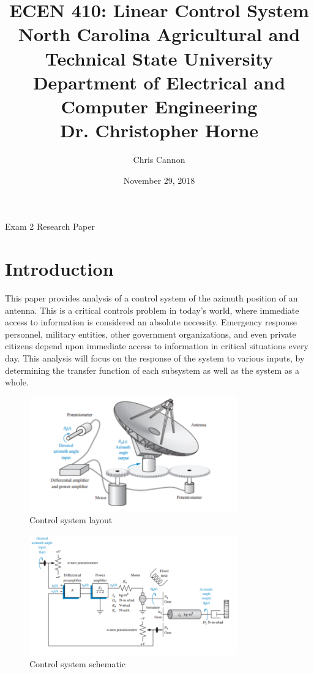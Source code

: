 \documentclass[12pt]{article}
\title {{\titleFont ECEN 410:  Linear Control System \\ North Carolina Agricultural and Technical State University \\ Department of Electrical and Computer Engineering \\ Dr. Christopher Horne}} %
\author{\titleFont  Chris Cannon} %
\date{\titleFont November 29, 2018}
\begin{document}
\begin{titlingpage}
\maketitle
\begin{center}
	Exam 2 Research Paper
\end{center}
\end{titlingpage}

\tableofcontents

\pagebreak

\section{Introduction}

This paper provides analysis of a control system of the azimuth position of an antenna. This is a critical controls problem in today's world, where immediate access to information is considered an absolute necessity. Emergency response personnel, military entities, other government organizations, and even private citizens depend upon immediate access to information in critical situations every day. This analysis will focus on the response of the system to various inputs, by determining the transfer function of each subsystem as well as the system as a whole.

\begin{figure}[H]
\begin{center}
	\includegraphics[width=0.8\textwidth]{./img/SystemLayout.png}
	\caption{\label{fig:SysLayout}Control system layout}
\end{center}
\end{figure}

\begin{figure}[H]
\begin{center}
	\includegraphics[width=0.8\textwidth]{./img/SystemSchematic.png}
	\caption{\label{fig:SysSchematic}Control system schematic}
\end{center}
\end{figure}
\end{document}
